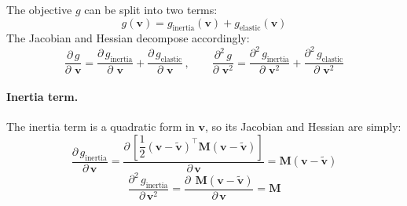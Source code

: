 \documentclass{article}
\newcommand{\pd}[2]{\dfrac{\partial\, #1}{\partial\, #2}}
\newcommand{\pdv}[2]{\dfrac{\partial^2\, #1}{\partial\, #2^2}}
\begin{document}
\begin{derivation}
The objective $g$ can be split into two terms:
%
\begin{equation*}
    g(\mathbf{v}) = g_{\text{inertia}}(\mathbf{v}) + g_{\text{elastic}}(\mathbf{v})
\end{equation*}
%
The Jacobian and Hessian decompose accordingly:
%
\begin{equation*}
    \pd{g}{\,\mathbf{v}} = 
    \pd{g_{\text{inertia}}}{\,\mathbf{v}} +
    \pd{g_{\text{elastic}}}{\,\mathbf{v}}\, ,
    \qquad
    \pdv{g}{\,\mathbf{v}} = 
    \pdv{g_{\text{inertia}}}{\,\mathbf{v}} +
    \pdv{g_{\text{elastic}}}{\,\mathbf{v}}
\end{equation*}

\paragraph{Inertia term.}
The inertia term is a quadratic form in $\mathbf{v}$, so its Jacobian and Hessian are simply:
%
\begin{equation*}
    \pd{g_{\text{inertia}}}{\mathbf{v}} =     
    \pd
    {\left[ \dfrac{1}{2}(\mathbf{v} - \tilde{\mathbf{v}})^\top \mathbf{M} (\mathbf{v} - \tilde{\mathbf{v}}) \right]}
    {\mathbf{v}} 
    = \mathbf{M} (\mathbf{v} - \tilde{\mathbf{v}})
\end{equation*}
\begin{equation*}
    \pdv{g_{\text{inertia}}}{\mathbf{v}}
    = \pd{\;\mathbf{M} (\mathbf{v} - \tilde{\mathbf{v}})}{\mathbf{v}} 
    = \mathbf{M}
\end{equation*}


\end{derivation}
\end{document}
